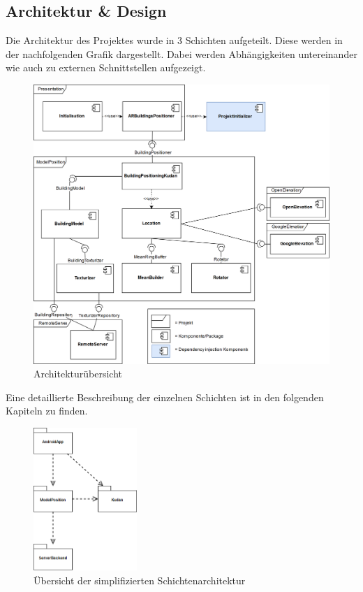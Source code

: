\documentclass[a4paper]{scrreprt}
\begin{document}
\subsection{Architektur \& Design}
Die Architektur des Projektes wurde in 3 Schichten aufgeteilt. Diese werden in der nachfolgenden Grafik dargestellt. Dabei werden Abhängigkeiten untereinander wie auch zu externen Schnittstellen aufgezeigt.

\begin{figure}[h!]
	\includegraphics[keepaspectratio, width=\textwidth]{ArchitekturOverviewV0_5.png}
	\caption{Architekturübersicht}
\end{figure}

Eine detaillierte Beschreibung der einzelnen Schichten ist in den folgenden Kapiteln zu finden.

\begin{figure}[h!]
  \center
  \includegraphics[width=0.35\textwidth]{SchichtenDiagramm.png}
  \caption{Übersicht der simplifizierten Schichtenarchitektur}
\end{figure}
\end{document}

